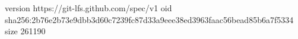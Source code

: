 version https://git-lfs.github.com/spec/v1
oid sha256:2b76e2b73e9dbb3d60c7239fc87d33a9eee38ed3963faac56bead85b6a7f5334
size 261190
